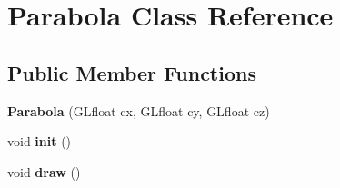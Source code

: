 \hypertarget{class_parabola}{}\section{Parabola Class Reference}
\label{class_parabola}
\subsection*{Public Member Functions}
\begin{DoxyCompactItemize}
\item 
\mbox{\label{class_parabola_a70249ceb2366e800b83335a07cf19c4f}} 
{\bfseries Parabola} (G\+Lfloat cx, G\+Lfloat cy, G\+Lfloat cz)
\item 
\mbox{\label{class_parabola_a9d1785d6e230e7bb8d47989fd812dad6}} 
void {\bfseries init} ()
\item 
\mbox{\label{class_parabola_ae2b8e3448ce58a0ec6e8a0c940751230}} 
void {\bfseries draw} ()
\end{DoxyCompactItemize}
